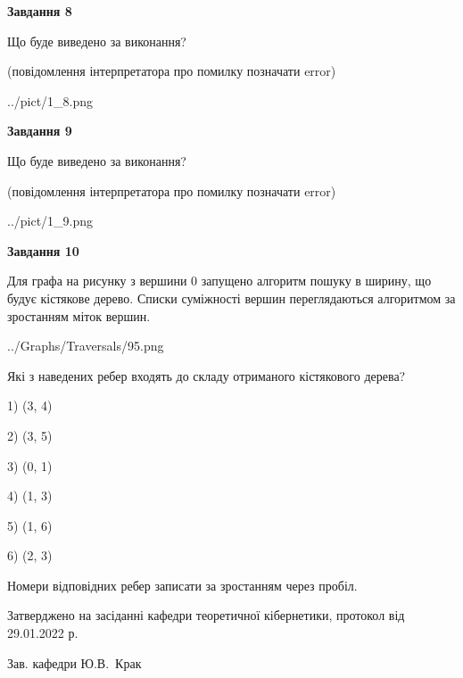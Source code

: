 \documentclass[12pt, ukrainian]{article}
\begin{document}
{\begin {large}
{\begin {center}\textbf{Завдання 8}\end {center}}\par
Що буде виведено за виконання?\par
 (повідомлення інтерпретатора про помилку позначати error)\par
\begin{center}
	{../pict/1_8.png}
\end{center}
\newpage

{\begin {center}\textbf{Завдання 9}\end {center}}\par
Що буде виведено за виконання?\par
 (повідомлення інтерпретатора про помилку позначати error)\par
\begin{center}
	{../pict/1_9.png}
\end{center}
\newpage

{\begin {center}\textbf{Завдання 10}\end {center}}\par
Для графа на рисунку з вершини 0 запущено алгоритм пошуку в ширину, що будує кістякове дерево. Списки суміжності вершин переглядаються алгоритмом за зростанням міток вершин.\par
\begin{center}
	{../Graphs/Traversals/95.png}
\end{center}
\par Які з наведених ребер входять до складу отриманого кістякового дерева?\par
1) (3, 4)\par
2) (3, 5)\par
3) (0, 1)\par
4) (1, 3)\par
5) (1, 6)\par
6) (2, 3)\par
{\vskip 15pt} Номери відповідних ребер записати за зростанням через пробіл.\par
\newpage


\end {large}
}
{\smallskip \begin {small} Затверджено на засіданні кафедри теоретичної кібернетики, протокол  від   29.01.2022 р.\par\smallskip\smallskip
{\parbox {6.5 cm}{Зав. кафедри \dotfill Ю.В.~Крак}} \end{small}}
\end{document}
